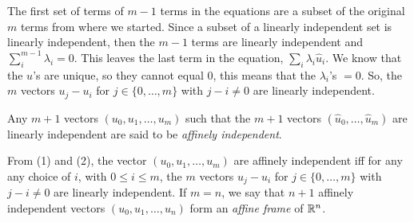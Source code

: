 \documentclass[12pt]{article}
\begin{document}
The first set of terms of $m-1$ terms in the equations are a subset of the original $m$ terms from where we started. Since a subset of a linearly independent set is linearly independent, then the $m-1$ terms are linearly independent and $\sum_{i}^{m-1} \lambda_i =0$. This leaves the last term in the equation, $\sum_{i} \lambda_i \hat{u}_i$. We know that the $u$'s are unique, so they cannot equal $0$, this means that the $\lambda_i$'s $=0$. So, the
$m$ vectors $u_j - u_i$  for $j \in \{0, \ldots, m\}$ with $j - i \not = 0$
are linearly independent. 

\medskip
Any $m + 1$ vectors  $(u_0, u_1, \ldots, u_{m })$ such that
the  $m + 1$ vectors
$(\widehat{u}_0, \ldots,  \widehat{u}_m)$ are linearly independent
are said to be {\it affinely independent\/}.

\medskip
From (1) and (2), the vector $(u_0, u_1, \ldots, u_{m })$ 
are affinely independent iff
for any  any choice of $i$, with $0 \leq i \leq m$, the
$m$ vectors $u_j - u_i$  for $j \in \{0, \ldots, m\}$ with $j - i \not = 0$
are linearly independent.
If $m = n$,  we say that $n + 1$ affinely independent 
vectors  $(u_0, u_1, \ldots, u_{n })$ form an {\it affine frame\/} of $\mathbb{R}^n$. 
\end{document}
